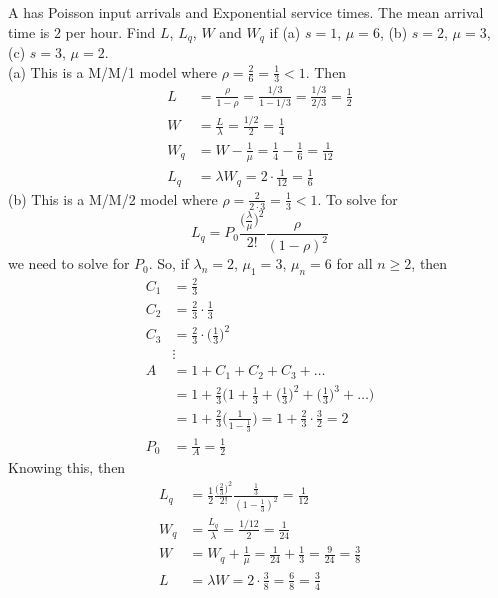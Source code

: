 \documentclass[12pt]{article}
\begin{document}
A \qs has Poisson input arrivals and Exponential service times. The mean arrival time is $2$ per hour. Find $L$, $L_q$, $W$ and $W_q$ if (a) $s=1$, $\mu = 6$, (b) $s=2$, $\mu = 3$, (c) $s=3$, $\mu=2$. \\
(a) This is a M/M/1 model where $\rho = \frac{2}{6} = \frac{1}{3} < 1$. Then $$ \begin{aligned} L &= \frac{\rho}{1-\rho} = \frac{1/3}{1 - 1/3} = \frac{1/3}{2/3} = \frac{1}{2} \\ 
W &= \frac{L}{\lambda} = \frac{1/2}{2} = \frac{1}{4} \\ W_q &= W - \frac{1}{\mu} = \frac{1}{4} - \frac{1}{6} = \frac{1}{12} \\ L_q &= \lambda W_q = 2 \cdot \frac{1}{12} = \frac{1}{6} \end{aligned} $$ 
(b) This is a M/M/2 model where $\rho = \frac{2}{2\cdot 3} = \frac{1}{3} < 1$. To solve for $$ L_q = P_0 \frac{\Big( \frac{\lambda}{\mu}\Big)^2}{2!}\frac{\rho}{(1-\rho)^2}$$ we need to solve for $P_0$. So, if $\lambda_n = 2$, $\mu_1 = 3$, $\mu_n = 6$ for all $n\geq 2$, then $$ \begin{aligned} C_1 &= \frac{2}{3} \\ C_2 &= \frac{2}{3} \cdot \frac{1}{3} \\ C_3 &= \frac{2}{3} \cdot \Big(\frac{1}{3}\Big)^2 \\ &\vdots \\ A &= 1 + C_1 + C_2 + C_3 + \dots \\ &= 1 + \frac{2}{3}\Big( 1+ \frac{1}{3} + \Big( \frac{1}{3} \Big)^2 + \Big( \frac{1}{3} \Big)^3 + \dots) \\ &= 1 + \frac{2}{3}\Big( \frac{1}{1 - \frac{1}{3}}\Big) = 1 + \frac{2}{3} \cdot \frac{3}{2} = 2 \\ P_0 &= \frac{1}{A} = \frac{1}{2} \end{aligned} $$ 
Knowing this, then $$ \begin{aligned} L_q &= \frac{1}{2} \frac{\Big( \frac{2}{3}\Big)^2}{2!} \frac{\frac{1}{3}}{(1 - \frac{1}{3})^2} = \frac{1}{12} \\ W_q &= \frac{L_q}{\lambda} = \frac{1/12}{2} = \frac{1}{24} \\ W &= W_q + \frac{1}{\mu} = \frac{1}{24} + \frac{1}{3} = \frac{9}{24} = \frac{3}{8} \\ L &= \lambda W = 2 \cdot \frac{3}{8} = \frac{6}{8} = \frac{3}{4} \end{aligned} $$ 
\end{document}
